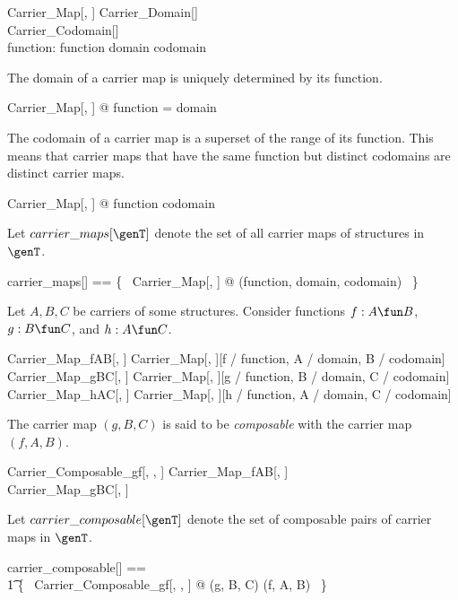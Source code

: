 \documentclass{amsart}
\begin{document}
\begin{schema}{Carrier\_Map}[\genT, \genU]
	Carrier\_Domain[\genT] \\
	Carrier\_Codomain[\genU] \\
	function: \genT \pfun \genU
\where
	function \in domain \fun codomain
\end{schema}

\begin{remark}
The domain of a carrier map is uniquely determined by its function.
\begin{zed}
	\forall Carrier\_Map[\setT, \setU] @ \dom function = domain
\end{zed}
\end{remark}

\begin{remark}
The codomain of a carrier map is a superset of the range of its function.
This means that carrier maps that have the same function but distinct codomains are distinct carrier maps.
\begin{zed}
	\forall Carrier\_Map[\setT, \setU] @ \ran function \subseteq codomain
\end{zed}
\end{remark}

Let $carrier\_maps[\genT]$ denote the set of all carrier maps of structures in $\genT$.
\begin{zed}
	carrier\_maps[\genT] == \{~ Carrier\_Map[\genT, \genT] @ (function, domain, codomain) ~\}
\end{zed}

Let $A, B, C$ be carriers of some structures.
Consider functions $f: A \fun B$, $g: B \fun C$, and $h: A \fun C$.
\begin{zed}
	Carrier\_Map\_fAB[\genT, \genU]  Carrier\_Map[\genT, \genU][f / function, A / domain, B / codomain]
\also
	Carrier\_Map\_gBC[\genT, \genU]  Carrier\_Map[\genT, \genU][g / function, B / domain, C / codomain]
\also
	Carrier\_Map\_hAC[\genT, \genU]  Carrier\_Map[\genT, \genU][h / function, A / domain, C / codomain]
\end{zed}

The carrier map $(g, B, C)$ is said to be \textit{composable} with the carrier map $(f, A, B)$.
\begin{schema}{Carrier\_Composable\_gf[\genT, \genU, \genV]}
	Carrier\_Map\_fAB[\genT, \genU] \\
	Carrier\_Map\_gBC[\genU, \genV]
\end{schema}

Let $carrier\_composable[\genT]$ denote the set of composable pairs of carrier maps in $\genT$.
\begin{zed}
	carrier\_composable[\genT] == \\
	\t1	\{~ Carrier\_Composable\_gf[\genT, \genT, \genT] @ (g, B, C) \mapsto (f, A, B) ~\}
\end{zed}
\end{document}
